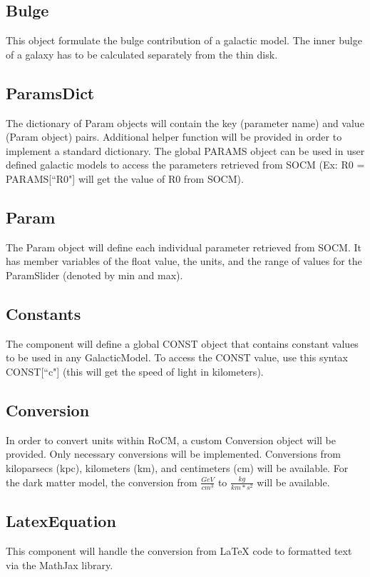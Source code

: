\documentclass[titlepage]{article}
\begin{document}
\subsection{Bulge}
This object formulate the bulge contribution of a galactic model. The inner bulge of a galaxy has to be calculated separately from the thin disk.

\subsection{ParamsDict}
The dictionary of Param objects will contain the key (parameter name) and value (Param object) pairs. Additional helper function will be provided in order to implement a standard dictionary. The global PARAMS object can be used in user defined galactic models to access the parameters retrieved from SOCM (Ex: R0 = PARAMS[``R0"] will get the value of R0 from SOCM).


\subsection{Param}
The Param object will define each individual parameter retrieved from SOCM. It has member variables of the float value, the units, and the range of values for the ParamSlider (denoted by min and max). 

\subsection{Constants}
The component will define a global CONST object that contains constant values to be used in any GalacticModel. To access the CONST value, use this syntax CONST[``c"] (this will get the speed of light in kilometers).


\subsection{Conversion}
In order to convert units within RoCM, a custom Conversion object will be provided. Only necessary conversions will be implemented. Conversions from kiloparsecs (kpc), kilometers (km), and centimeters (cm) will be available. For the dark matter model, the conversion from $\frac{GeV}{cm^3}$ to $\frac{kg}{km*s^2}$ will be available.



\subsection{LatexEquation}
This component will handle the conversion from \LaTeX \- code to formatted text via the MathJax library.
\end{document}
